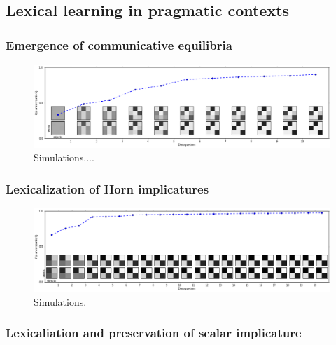\documentclass{article} %
\begin{document}
\subsection{Lexical learning in pragmatic contexts}

\subsubsection{Emergence of communicative equilibria}

\begin{figure}
\centering
\includegraphics[width=5.5in]{figures/galantucci3.png}
\caption{\label{fig:glantucci} Simulations....} 
\end{figure}


\subsubsection{Lexicalization of Horn implicatures} 

\begin{figure}
\centering
\includegraphics[width=5.5in]{figures/horn.png}
\caption{\label{fig:horn} Simulations.} 
\end{figure}


\subsubsection{Lexicaliation and preservation of scalar implicature}
\end{document}
